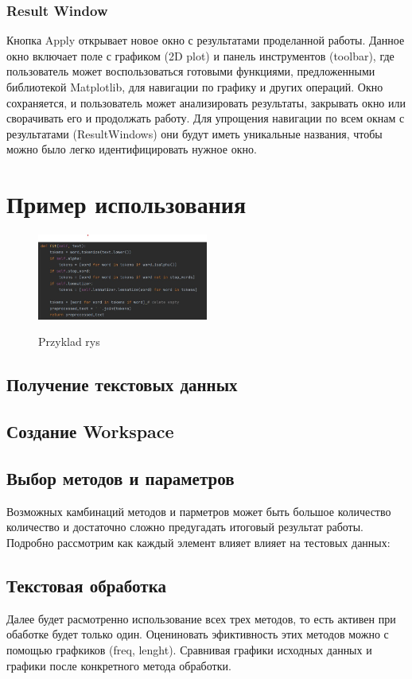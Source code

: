 		\subsubsection{Result Window}		
			Кнопка Apply открывает новое окно с результатами проделанной работы. Данное окно включает поле с графиком (2D plot) и панель инструментов (toolbar), где пользователь может воспользоваться готовыми функциями, предложенными библиотекой Matplotlib, для навигации по графику и других операций. Окно сохраняется, и пользователь может анализировать результаты, закрывать окно или сворачивать его и продолжать работу. Для упрощения навигации по всем окнам с результатами (ResultWindows) они будут иметь уникальные названия, чтобы можно было легко идентифицировать нужное окно.
			

\section{Пример использования}
	\begin{figure}
		\centering
		\scalebox{0.25} {\includegraphics[width=0.5\textwidth]{./img/rys1.jpg	}}
		\caption{Przyklad rys}
		\label{fig:rys1}
	\end{figure}
		
	\subsection{Получение текстовых данных}
		
	\subsection{Создание Workspace}
		
	\subsection{Выбор методов и параметров} 
		Возможных камбинаций методов и парметров может быть большое количество количество и достаточно сложно предугадать итоговый результат работы. Подробно рассмотрим как каждый элемент влияет влияет на тестовых данных:
		
	\subsection{Текстовая обработка} 
		Далее будет расмотренно использование всех трех методов, то есть активен при обаботке будет только один. Оцениновать эфиктивность этих методов можно с помощью графкиков (freq, lenght). Сравнивая графики исходных данных и графики после конкретного метода обработки.
		
